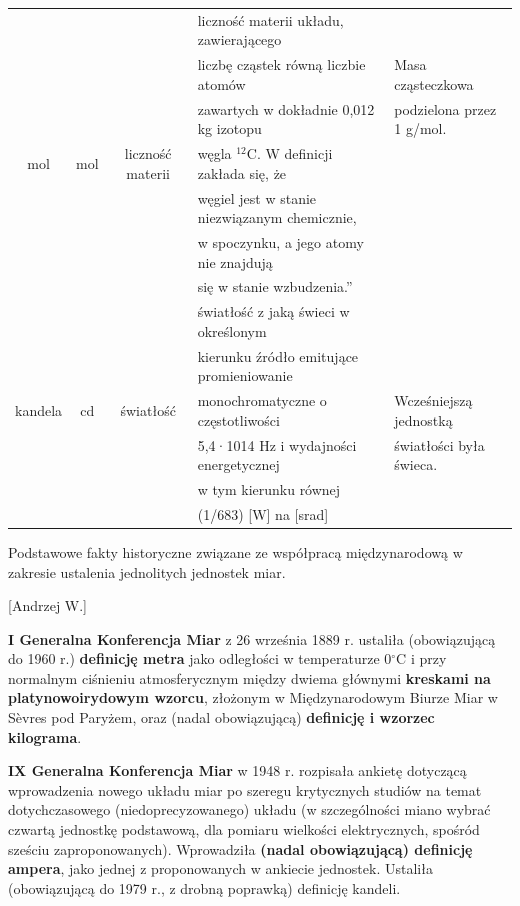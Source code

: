 \documentclass{article}
\begin{document}
\begin{enumerate}
{\begin{tabular}{cccll}
\hline
&&&	liczność materii układu, zawierającego\\
&&& liczbę cząstek równą liczbie atomów& Masa cząsteczkowa \\
&&& zawartych w dokładnie 0,012 kg izotopu&podzielona przez 1 g/mol.\\
mol&	mol&	liczność materii& węgla $^{12}$C. W definicji zakłada się, że \\
&&&węgiel jest w stanie niezwiązanym chemicznie,\\
&&& w spoczynku, a jego atomy nie znajdują\\
&&& się w stanie wzbudzenia.”\\
\hline

&&&	 światłość z jaką świeci w określonym\\
&&& kierunku źródło emitujące promieniowanie\\
kandela&	cd&	światłość& monochromatyczne o częstotliwości&Wcześniejszą jednostką\\
&&& 5,4·1014 Hz i wydajności energetycznej&światłości była świeca.\\
&&& w tym kierunku równej\\
&&& (1/683) [W] na [srad]\\
\hline\hline	
  
\end{tabular}
}


{\Large \bf  \item Podstawowe fakty historyczne związane ze współpracą międzynarodową w
zakresie ustalenia jednolitych jednostek miar.} [Andrzej W.]


{\bf I Generalna Konferencja Miar} z 26 września 1889 r. ustaliła (obowiązującą do 1960 r.) {\bf definicję metra} jako odległości w temperaturze 0$^\circ$C i przy normalnym ciśnieniu atmosferycznym między dwiema głównymi {\bf kreskami na platynowoirydowym wzorcu}, złożonym w Międzynarodowym Biurze Miar w Sèvres pod Paryżem, oraz (nadal obowiązującą) {\bf definicję i wzorzec kilograma}.

{\bf IX Generalna Konferencja Miar} w 1948 r. rozpisała ankietę dotyczącą wprowadzenia nowego układu miar po szeregu krytycznych studiów na temat dotychczasowego (niedoprecyzowanego) układu (w szczególności miano wybrać czwartą jednostkę podstawową, dla pomiaru wielkości elektrycznych, spośród sześciu zaproponowanych). Wprowadziła {\bf (nadal obowiązującą) definicję ampera}, jako jednej z proponowanych w ankiecie jednostek. Ustaliła (obowiązującą do 1979 r., z drobną poprawką) definicję kandeli.


\end{enumerate}
\end{document}

